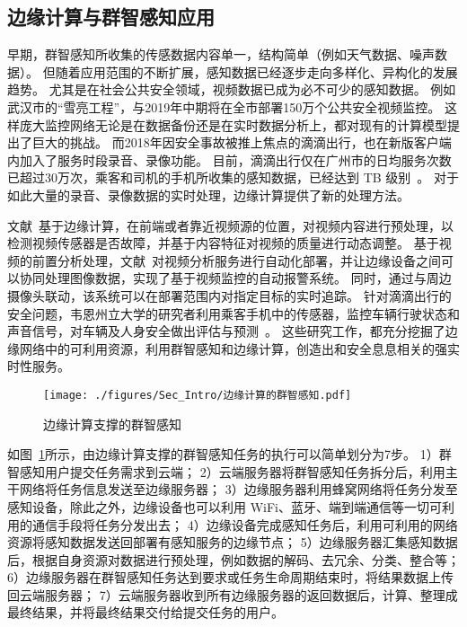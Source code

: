 \subsection{边缘计算与群智感知应用}



早期，群智感知所收集的传感数据内容单一，结构简单（例如天气数据、噪声数据）。
但随着应用范围的不断扩展，感知数据已经逐步走向多样化、异构化的发展趋势。
尤其是在社会公共安全领域，视频数据已成为必不可少的感知数据。
例如武汉市的“雪亮工程”，与2019年中期将在全市部署150万个公共安全视频监控。
这样庞大监控网络无论是在数据备份还是在实时数据分析上，都对现有的计算模型提出了巨大的挑战。
而2018年因安全事故被推上焦点的滴滴出行，也在新版客户端内加入了服务时段录音、录像功能。
目前，滴滴出行仅在广州市的日均服务次数已超过30万次，乘客和司机的手机所收集的感知数据，已经达到 TB 级别~\cite{DBLP:conf/aaai/Yao0KTJLGYL18}。
对于如此大量的录音、录像数据的实时处理，边缘计算提供了新的处理方法。

文献~\cite{DBLP:conf/edge/SunLS17}基于边缘计算，在前端或者靠近视频源的位置，对视频内容进行预处理，以检测视频传感器是否故障，并基于内容特征对视频的质量进行动态调整。
基于视频的前置分析处理，文献~\cite{DBLP:journals/iotj/ZhangZSZ18}对视频分析服务进行自动化部署，并让边缘设备之间可以协同处理图像数据，实现了基于视频监控的自动报警系统。
同时，通过与周边摄像头联动，该系统可以在部署范围内对指定目标的实时追踪。
针对滴滴出行的安全问题，韦恩州立大学的研究者利用乘客手机中的传感器，监控车辆行驶状态和声音信号，对车辆及人身安全做出评估与预测~\cite{DBLP:conf/edge/LiuZQS18}。
这些研究工作，都充分挖掘了边缘网络中的可利用资源，利用群智感知和边缘计算，创造出和安全息息相关的强实时性服务。


\begin{figure}[!h]
  \centering
  \texttt{[image: ./figures/Sec\_Intro/边缘计算的群智感知.pdf]}
  \vspace{-0.5em}
  \caption{边缘计算支撑的群智感知}
  \label{Figure_MCS_with_EC}
\end{figure}

如图~\ref{Figure_MCS_with_EC}所示，由边缘计算支撑的群智感知任务的执行可以简单划分为7步。
1）群智感知用户提交任务需求到云端；
2）云端服务器将群智感知任务拆分后，利用主干网络将任务信息发送至边缘服务器；
3）边缘服务器利用蜂窝网络将任务分发至感知设备，除此之外，边缘设备也可以利用 WiFi、蓝牙、端到端通信等一切可利用的通信手段将任务分发出去；
4）边缘设备完成感知任务后，利用可利用的网络资源将感知数据发送回部署有感知服务的边缘节点；
5）边缘服务器汇集感知数据后，根据自身资源对数据进行预处理，例如数据的解码、去冗余、分类、整合等；
6）边缘服务器在群智感知任务达到要求或任务生命周期结束时，将结果数据上传回云端服务器；
7）云端服务器收到所有边缘服务器的返回数据后，计算、整理成最终结果，并将最终结果交付给提交任务的用户。

